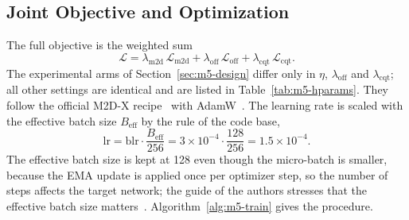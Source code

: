 \documentclass{FastFyp}
\begin{document}
\subsection{Joint Objective and Optimization}
The full objective is the weighted sum
\begin{equation}
\mathcal{L}=\lambda_{\mathrm{m2d}}\,\mathcal{L}_{\mathrm{m2d}}+\lambda_{\mathrm{off}}\,\mathcal{L}_{\mathrm{off}}+\lambda_{\mathrm{cqt}}\,\mathcal{L}_{\mathrm{cqt}}.
\label{eq:m5-total}
\end{equation}
The experimental arms of Section~\ref{sec:m5-design} differ only in $\eta$, $\lambda_{\mathrm{off}}$ and $\lambda_{\mathrm{cqt}}$; all other settings are identical and are listed in Table~\ref{tab:m5-hparams}. They follow the official M2D-X recipe~\cite{ref:M2DGit,ref:Niizumi:2024m2dx} with AdamW~\cite{ref:Loshchilov:2019adamw}. The learning rate is scaled with the effective batch size $B_{\mathrm{eff}}$ by the rule of the code base,
\begin{equation}
\mathrm{lr}=\mathrm{blr}\cdot\frac{B_{\mathrm{eff}}}{256}=3\times10^{-4}\cdot\frac{128}{256}=1.5\times10^{-4}.
\label{eq:m5-lr}
\end{equation}
The effective batch size is kept at 128 even though the micro-batch is smaller, because the EMA update is applied once per optimizer step, so the number of steps affects the target network; the guide of the authors stresses that the effective batch size matters~\cite{ref:M2DGit}. Algorithm~\ref{alg:m5-train} gives the procedure.
\end{document}

